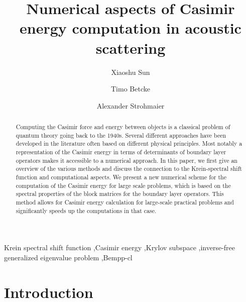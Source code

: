 \documentclass[review]{elsarticle}
\begin{document}
\begin{frontmatter}

\title{Numerical aspects of Casimir energy computation in acoustic scattering}

\author[mymainaddress]{Xiaoshu Sun}

\author[mymainaddress]{Timo Betcke}
\address[mymainaddress]{Department of Mathematics, University College London, London, WC1E 6BT, UK}

\author[mysecondaryaddress]{Alexander Strohmaier}
\address[mysecondaryaddress]{School of Mathematics, University of Leeds, Leeds, LS2 9JT, UK}



\begin{abstract}
    Computing the Casimir force and energy between objects is a classical problem of quantum theory going back to the 1940s. 
    Several different approaches have been developed in the literature often based on different physical principles. Most notably a representation 
    of the Casimir energy in terms of determinants of boundary layer operators makes it accessible to a numerical approach. In this paper, we first give 
    an overview of the various methods and discuss the connection to the Krein-spectral shift function and computational aspects. We present a new numerical scheme for the 
    computation of the Casimir energy for large scale problems, which is based on the spectral properties of the block matrices for the boundary layer 
    operators. This method allows for Casimir energy calculation for large-scale practical problems and significantly speeds up the computations in that 
    case.
   \end{abstract}

\begin{keyword}
Krein spectral shift function \sep Casimir energy \sep Krylov subspace \sep inverse-free generalized eigenvalue problem \sep Bempp-cl
\end{keyword}

\end{frontmatter}

\section{Introduction}\label{Introduction}

\end{document}

